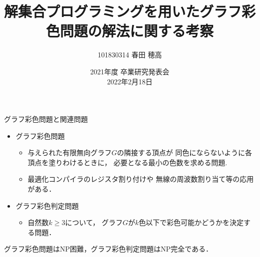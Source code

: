 \documentclass[dvipdfmx,11pt]{beamer}
\title{解集合プログラミングを用いたグラフ彩色問題の解法に関する考察}
\author{101830314 春田 穂高}
\institute{番原研究室}
\date{2021年度 卒業研究発表会\\2022年2月18日}
\begin{document}
\frame{\maketitle}
\begin{frame}{グラフ彩色問題と関連問題}
 \begin{itemize}
  \item \alert{グラフ彩色問題}
        \begin{itemize}
	 \item 与えられた有限無向グラフ$G$の隣接する頂点が
	       同色にならないように各頂点を塗りわけるときに，
	       必要となる最小の色数を求める問題.
	 \item 最適化コンパイラのレジスタ割り付けや
	       無線の周波数割り当て等の応用がある．
        \end{itemize}
  \item \alert{グラフ彩色判定問題}
        \begin{itemize}
         \item 自然数$k\geq 3$について，
	       グラフ$G$が$k$色以下で彩色可能かどうかを決定する問題．
        \end{itemize}
 \end{itemize}

 \begin{alertblock}{}
  \centering
  グラフ彩色問題はNP困難，グラフ彩色判定問題はNP完全である．
 \end{alertblock}
\end{frame}
\end{document}
